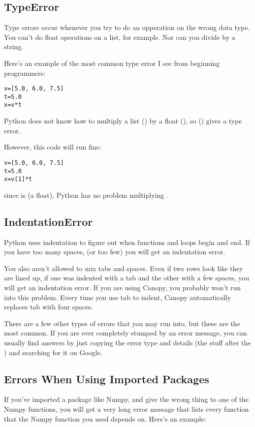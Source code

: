 \subsection*{TypeError}
Type errors occur whenever you try to do an opperation on the wrong data type.  You can't do float operations on a list, for example.  Nor can you divide by a string.

Here's an example of the most common type error I see from beginning programmers:
\begin{Verbatim}
v=[5.0, 6.0, 7.5]
t=5.0
x=v*t
\end{Verbatim}
Python does not know how to multiply a list () by a float (), so () gives a type error.

However, this code will run fine:
\begin{Verbatim}
v=[5.0, 6.0, 7.5]
t=5.0
x=v[1]*t
\end{Verbatim}
since  is  (a float), Python has no problem multiplying .

\subsection*{IndentationError}
Python uses indentation to figure out when functions and loops begin and end.  If you have too many spaces, (or too few) you will get an indentation error.

You also aren't allowed to mix tabs and spaces.  Even if two rows look like they are lined up, if one was indented with a tab and the other with a few spaces, you will get an indentation error.  If you are using Canopy, you probably won't run into this problem. Every time you use tab to indent, Canopy automatically replaces tab with four spaces.

There are a few other types of errors that you may run into, but these are the most common.  If you are ever completely stumped by an error message, you can usually find answers by just copying the error type and details (the stuff after the \code{:}) and searching for it on Google.

\subsection*{Errors When Using Imported Packages}
If you've imported a package like Numpy, and give the wrong thing to one of the Numpy functions, you will get a very long error message that lists every function that the Numpy function you used depends on.  Here's an example:

